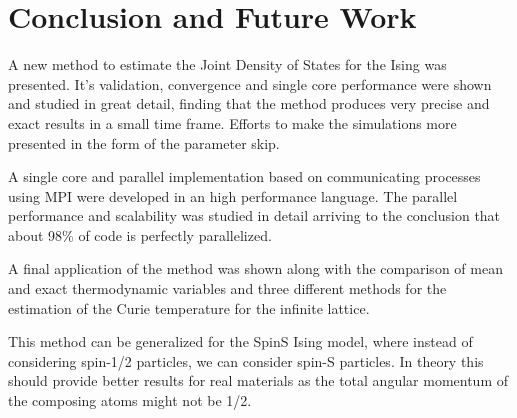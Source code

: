 \chapter{Conclusion and Future Work}

	A new method to estimate the Joint Density of States for the Ising was presented. It's validation, convergence and single core performance were shown and studied in great detail, finding that the method produces very precise and exact results in a small time frame. Efforts to make the simulations more presented in the form of the parameter skip. 
	
	A single core and parallel implementation based on communicating processes using MPI were developed in an high performance language. The parallel performance and scalability was studied in detail arriving to the conclusion that about 98\% of code is perfectly parallelized.
	
	A final application of the method was shown along with the comparison of mean and exact thermodynamic variables and three different methods for the estimation of the Curie temperature for the infinite lattice.
	
	This method can be generalized for the SpinS Ising model, where instead of considering spin-1/2 particles, we can consider spin-S particles. In theory this should provide better results for real materials as the total angular momentum of the composing atoms might not be 1/2.
	